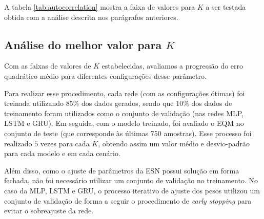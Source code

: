 \documentclass[a4paper, 12pt]{article}
\begin{document}
A tabela \ref{tab:autocorrelation} mostra a faixa de valores para $K$ a ser testada obtida com a análise descrita nos parágrafos anteriores.
\begin{table}[H]
\begin{center}
\caption{Faixa de valores inteiros para $K$ a ser testada em cada cenário para todas as redes.}
\label{tab:autocorrelation}
\end{center}
\end{table}

\subsection{Análise do melhor valor para $K$}

Com as faixas de valores de $K$ estabelecidas, avaliamos a progressão do erro quadrático médio para diferentes configurações desse parâmetro.

Para realizar esse procedimento, cada rede (com as configurações ótimas) foi treinada utilizando $85\%$ dos dados gerados, sendo que $10\%$ dos dados de treinamento foram utilizados como o conjunto de validação (nas redes MLP, LSTM e GRU). Em seguida, com o modelo treinado, foi avaliado o EQM no conjunto de teste (que corresponde às últimas 750 amostras). Esse processo foi realizado $5$ vezes para cada $K$, obtendo assim um valor médio e desvio-padrão para cada modelo e em cada cenário. 

Além disso, como o ajuste de parâmetros da ESN possui solução em forma fechada, não foi necessário utilizar um conjunto de validação no treinamento. No caso da MLP, LSTM e GRU, o processo iterativo de ajuste dos pesos utilizou um conjunto de validação de forma a seguir o procedimento de \textit{early stopping} para evitar o sobreajuste da rede.
\end{document}
